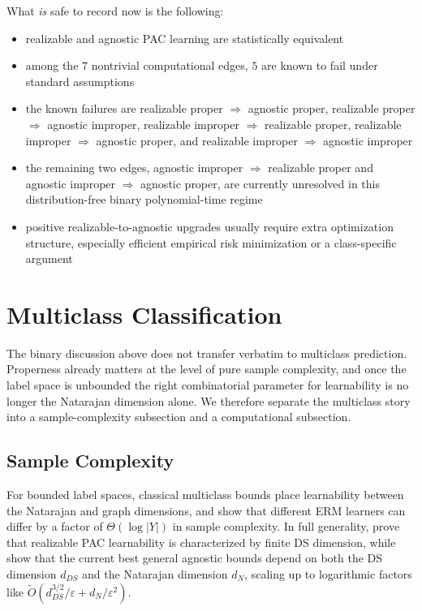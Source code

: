 What \emph{is} safe to record now is the following:

\begin{itemize}
\item realizable and agnostic PAC learning are statistically equivalent
\item among the $7$ nontrivial computational edges, $5$ are known to fail under standard assumptions
\item the known failures are realizable proper $\Rightarrow$ agnostic proper, realizable proper $\Rightarrow$ agnostic improper, realizable improper $\Rightarrow$ realizable proper, realizable improper $\Rightarrow$ agnostic proper, and realizable improper $\Rightarrow$ agnostic improper
\item the remaining two edges, agnostic improper $\Rightarrow$ realizable proper and agnostic improper $\Rightarrow$ agnostic proper, are currently unresolved in this distribution-free binary polynomial-time regime
\item positive realizable-to-agnostic upgrades usually require extra optimization structure, especially efficient empirical risk minimization or a class-specific argument
\end{itemize}

\section{Multiclass Classification}\label{sec:multiclass}

The binary discussion above does not transfer verbatim to multiclass prediction. Properness already matters at the level of pure sample complexity, and once the label space is unbounded the right combinatorial parameter for learnability is no longer the Natarajan dimension alone. We therefore separate the multiclass story into a sample-complexity subsection and a computational subsection.

\subsection{Sample Complexity}

For bounded label spaces, classical multiclass bounds place learnability between the Natarajan and graph dimensions, and \citet{daniely2015multiclass} show that different ERM learners can differ by a factor of $\Theta(\log |Y|)$ in sample complexity. In full generality, \citet{brukhim2022} prove that realizable PAC learnability is characterized by finite DS dimension, while \citet{cohen2025multiclass} show that the current best general agnostic bounds depend on both the DS dimension $d_{DS}$ and the Natarajan dimension $d_N$, scaling up to logarithmic factors like $\widetilde{O}(d_{DS}^{3/2}/\varepsilon + d_N/\varepsilon^2)$.

